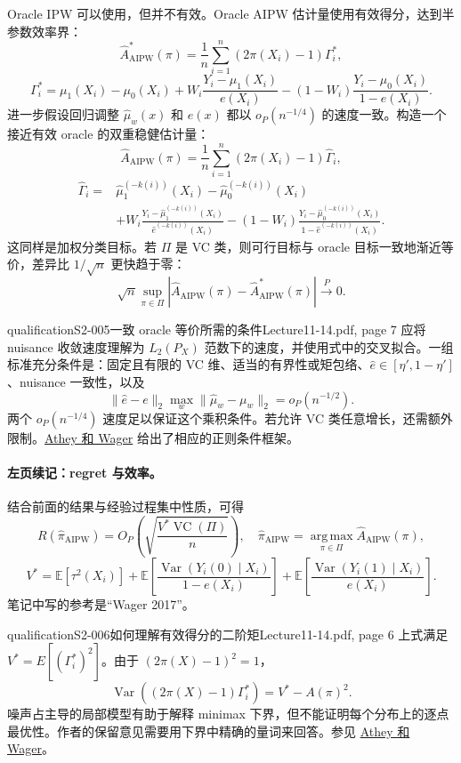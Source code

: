 Oracle IPW 可以使用，但并不有效。Oracle AIPW 估计量使用有效得分，达到半参数效率界：
\[
 \widehat A^*_{\mathrm{AIPW}}(\pi)
 =\frac1n\sum_{i=1}^n(2\pi(X_i)-1)\Gamma_i^*,
\]
\[
 \Gamma_i^*=\mu_1(X_i)-\mu_0(X_i)
 +W_i\frac{Y_i-\mu_1(X_i)}{e(X_i)}
 -(1-W_i)\frac{Y_i-\mu_0(X_i)}{1-e(X_i)}.
\]
进一步假设回归调整 $\widehat\mu_w(x)$ 和 $\widehat e(x)$ 都以 $o_P(n^{-1/4})$ 的速度一致。构造一个接近有效 oracle 的双重稳健估计量：
\[
 \widehat A_{\mathrm{AIPW}}(\pi)
 =\frac1n\sum_{i=1}^n(2\pi(X_i)-1)\widehat\Gamma_i,
\]
\begin{align*}
 \widehat\Gamma_i={}&\widehat\mu_1^{(-k(i))}(X_i)
 -\widehat\mu_0^{(-k(i))}(X_i)\\
 &+W_i\frac{Y_i-\widehat\mu_1^{(-k(i))}(X_i)}
 {\widehat e^{(-k(i))}(X_i)}
 -(1-W_i)\frac{Y_i-\widehat\mu_0^{(-k(i))}(X_i)}
 {1-\widehat e^{(-k(i))}(X_i)}.
\end{align*}
这同样是加权分类目标。若 $\Pi$ 是 VC 类，则可行目标与 oracle 目标一致地渐近等价，差异比 $1/\sqrt n$ 更快趋于零：
\[
 \sqrt n\sup_{\pi\in\Pi}
 \left|\widehat A_{\mathrm{AIPW}}(\pi)
 -\widehat A^*_{\mathrm{AIPW}}(\pi)\right|
 \xrightarrow{P}0.\tag{11.17}
\]

\begin{reviewnote}{qualification}{S2-005}{一致 oracle 等价所需的条件}{Lecture11-14.pdf, page 7}
应将 nuisance 收敛速度理解为 $L_2(P_X)$ 范数下的速度，并使用式中的交叉拟合。一组标准充分条件是：固定且有限的 VC 维、适当的有界性或矩包络、$\widehat e\in[\eta',1-\eta']$、nuisance 一致性，以及
\[
 \|\widehat e-e\|_2\max_w\|\widehat\mu_w-\mu_w\|_2=o_P(n^{-1/2}).
\]
两个 $o_P(n^{-1/4})$ 速度足以保证这个乘积条件。若允许 VC 类任意增长，还需额外限制。\href{https://arxiv.org/abs/1702.02896}{Athey 和 Wager} 给出了相应的正则条件框架。
\end{reviewnote}


\paragraph{左页续记：regret 与效率。}
结合前面的结果与经验过程集中性质，可得
\[
 R(\widehat\pi_{\mathrm{AIPW}})
 =O_P\left(\sqrt{\frac{V^*\operatorname{VC}(\Pi)}n}\right),
 \quad
 \widehat\pi_{\mathrm{AIPW}}
 =\operatorname*{arg\,max}_{\pi\in\Pi}\widehat A_{\mathrm{AIPW}}(\pi),
\]
\[
 V^*=\mathbb E[\tau^2(X_i)]
 +\mathbb E\left[\frac{\operatorname{Var}(Y_i(0)\mid X_i)}{1-e(X_i)}\right]
 +\mathbb E\left[\frac{\operatorname{Var}(Y_i(1)\mid X_i)}{e(X_i)}\right].
\]
笔记中写的参考是“Wager 2017”。
\begin{reviewnote}{qualification}{S2-006}{如何理解有效得分的二阶矩}{Lecture11-14.pdf, page 6}
上式满足 $V^*=E[(\Gamma_i^*)^2]$。由于 $(2\pi(X)-1)^2=1$，
\[
 \operatorname{Var}((2\pi(X)-1)\Gamma_i^*)=V^*-A(\pi)^2.
\]
噪声占主导的局部模型有助于解释 minimax 下界，但不能证明每个分布上的逐点最优性。作者的保留意见需要用下界中精确的量词来回答。参见 \href{https://arxiv.org/abs/1702.02896}{Athey 和 Wager}。
\end{reviewnote}


